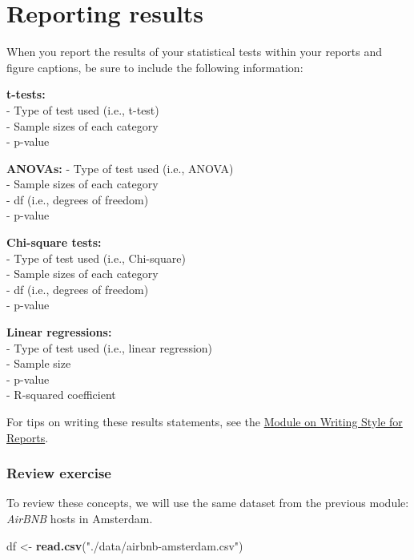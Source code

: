 \documentclass[
]{book}
\newenvironment{Shaded}{\begin{snugshade}}{\end{snugshade}}
\newcommand{\KeywordTok}[1]{\textcolor[rgb]{0.13,0.29,0.53}{\textbf{#1}}}
\newcommand{\NormalTok}[1]{#1}
\newcommand{\StringTok}[1]{\textcolor[rgb]{0.31,0.60,0.02}{#1}}
\begin{document}
\hypertarget{reporting-results}{%
\section*{Reporting results}\label{reporting-results}}

When you report the results of your statistical tests within your reports and figure captions, be sure to include the following information:

\textbf{t-tests:}\\
- Type of test used (i.e., t-test)\\
- Sample sizes of each category\\
- p-value

\textbf{ANOVAs:}
- Type of test used (i.e., ANOVA)\\
- Sample sizes of each category\\
- df (i.e., degrees of freedom)\\
- p-value

\textbf{Chi-square tests:}\\
- Type of test used (i.e., Chi-square)\\
- Sample sizes of each category\\
- df (i.e., degrees of freedom)\\
- p-value

\textbf{Linear regressions:}\\
- Type of test used (i.e., linear regression)\\
- Sample size\\
- p-value\\
- R-squared coefficient

For tips on writing these results statements, see the \protect\hyperlink{style}{Module on Writing Style for Reports}.

\hypertarget{review-exercise-3}{%
\subsubsection*{Review exercise}\label{review-exercise-3}}

To review these concepts, we will use the same dataset from the previous module: \emph{AirBNB} hosts in Amsterdam.

\begin{Shaded}
\begin{Highlighting}[]
\NormalTok{df <-}\StringTok{ }\KeywordTok{read.csv}\NormalTok{(}\StringTok{"./data/airbnb-amsterdam.csv"}\NormalTok{)}
\end{Highlighting}
\end{Shaded}
\end{document}
